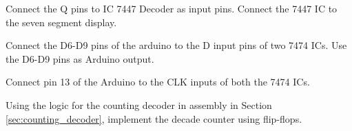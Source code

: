 %
\begin{problem}
Connect the Q pins to IC 7447 Decoder as input pins.  Connect the 7447 IC to the seven segment display.
\end{problem}
\begin{problem}
Connect the D6-D9 pins of the arduino to the D input pins of two 7474 ICs. Use the D6-D9 pins as Arduino output.
\end{problem}
\begin{problem}
Connect pin 13 of the Arduino to the CLK inputs of both the 7474 ICs.
\end{problem}
\begin{problem}
Using the logic for the counting decoder in assembly in Section \ref{sec:counting_decoder}, implement the decade counter using flip-flops.
\end{problem}



